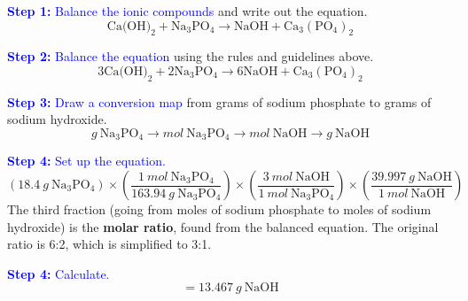 \documentclass[a4paper, 12pt]{article}
\begin{document}
\textcolor{blue}{\textbf{Step 1:} Balance the ionic compounds} and write out the equation.
$$\text{Ca(OH)}_2 + \text{Na}_3\text{PO}_4 \longrightarrow \text{NaOH} +  \text{Ca}_3(\text{PO}_4)_2$$

\textcolor{blue}{\textbf{Step 2:} Balance the equation} using the rules and guidelines above.
$$\text{3Ca(OH)}_2 + \text{2Na}_3\text{PO}_4 \longrightarrow \text{6NaOH} +  \text{Ca}_3(\text{PO}_4)_2$$

\textcolor{blue}{\textbf{Step 3:} Draw a conversion map} from grams of sodium phosphate to grams of sodium hydroxide.
$$g \: \text{Na}_3\text{PO}_4 \longrightarrow mol \: \text{Na}_3\text{PO}_4 \longrightarrow mol \: {\text{NaOH}} \longrightarrow g \: {\text{NaOH}}$$

\textcolor{blue}{\textbf{Step 4:} Set up the equation.} 
$$(18.4 \: g \: \text{Na}_3\text{PO}_4) \times \left(\frac{1 \: mol \: \text{Na}_3\text{PO}_4}{163.94 \: g \: \text{Na}_3\text{PO}_4}\right) \times \left(\frac{3 \: mol \: \text{NaOH}}{1 \: mol \: \text{Na}_3\text{PO}_4}\right) \times \left(\frac{39.997 \: g \: \text{NaOH}}{1 \: mol \: \text{NaOH}}\right) $$
The third fraction (going from moles of sodium phosphate to moles of sodium hydroxide) is the \textbf{molar ratio}, found from the balanced equation. The original ratio is 6:2, which is simplified to 3:1.

\textcolor{blue}{\textbf{Step 4:} Calculate.} 
$$= \boxed{13.467 \: g \: \text{NaOH}}$$
\end{document}
